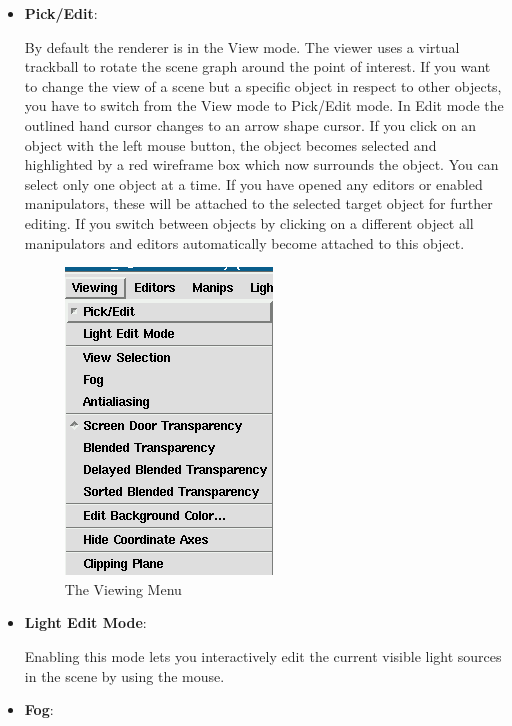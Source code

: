 \begin{itemize}
\item {\bf Pick/Edit}:

By default the renderer is in the View mode. The viewer uses a virtual
trackball to rotate the scene graph around the point of interest. If you want
to change the view of a scene but a specific object in respect to other objects,
you have to switch from the View mode to Pick/Edit mode. In Edit mode the
outlined hand cursor changes to an arrow shape cursor. If you click on an object
with the left mouse button, the object becomes selected and highlighted by a
red wireframe box which now surrounds the object. You can select only one object
at a time. If you have opened any editors or enabled manipulators, these will
be attached to the selected target object for further editing. If you switch
between objects by clicking on a different object all manipulators and editors
automatically become attached to this object.

 \latexonly
 \begin{figure}[htp]
  \begin{center}
   \includegraphics[scale=0.7]{renderer/pict/image15}
   \caption{The Viewing Menu}
	\label{fig61}
  \end{center}
 \end{figure}
 \endlatexonly
\clearpage

\item {\bf Light Edit Mode}:

Enabling this mode lets you interactively edit the current visible light sources
in the scene by using the mouse. 

\item {\bf Fog}:


\end{itemize}
